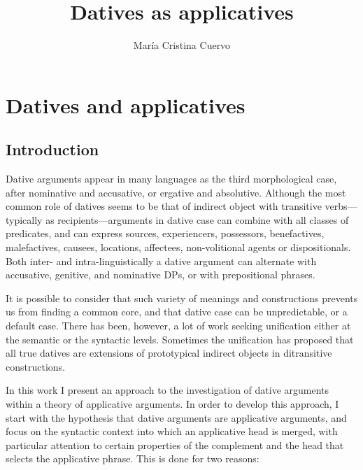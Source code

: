 \documentclass[output=paper,colorlinks,citecolor=brown,nonflat]{./langscibook}
\author{María Cristina Cuervo\affiliation{University of Toronto}}
\title{Datives as applicatives}
\begin{document}
\maketitle 

\section{Datives and applicatives}\label{sec:cuervo:1}

\subsection{Introduction}\label{sec:cuervo:1.1}

Dative arguments appear in many languages as the third morphological case, after nominative and accusative, or ergative and absolutive. Although the most common role of datives seems to be that of indirect object with transitive verbs—typically as recipients—arguments in dative case can combine with all classes of predicates, and can express sources, experiencers, possessors, benefactives, malefactives, causees, locations, affectees, non-volitional agents or dispositionals. Both inter- and intra-linguistically a dative argument can alternate with accusative, genitive, and nominative DPs, or with prepositional phrases. 

It is possible to consider that such variety of meanings and constructions prevents us from finding a common core, and that dative case can be unpredictable, or a default case.  There has been, however, a lot of work seeking unification either at the semantic or the syntactic levels. Sometimes the unification has proposed that all true datives are extensions of prototypical indirect objects in ditransitive constructions. 

In this work I present an approach to the investigation of dative arguments within a theory of applicative arguments. In order to develop this approach, I start with the hypothesis that dative arguments are applicative arguments, and focus on the syntactic context into which an applicative head is merged, with particular attention to certain properties of the complement and the head that selects the applicative phrase. This is done for two reasons:
\end{document}
